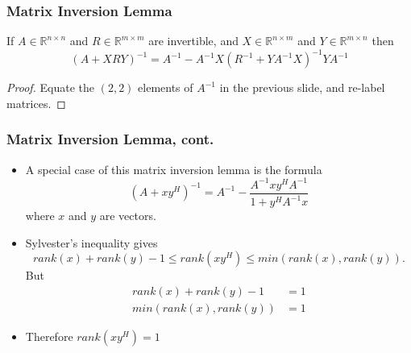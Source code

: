 \documentclass{beamer}
\begin{document}
\begin{frame}\frametitle{Matrix Inversion Lemma}
	\begin{lemma}
		If $A\in\mathbb{R}^{n\times n}$ and $R\in\mathbb{R}^{m\times m}$ are invertible, and $X\in\mathbb{R}^{n\times m}$ and $Y\in\mathbb{R}^{m\times n}$ then
		\[ (A + X R Y)^{-1} = A^{-1} - A^{-1}X(R^{-1}+YA^{-1}X)^{-1}YA^{-1} \]
	\end{lemma}
	\begin{proof}  Equate the $(2,2)$ elements of $A^{-1}$ in the previous slide, and re-label matrices.	
	\end{proof}
	
\end{frame}

\begin{frame}\frametitle{Matrix Inversion Lemma, cont.}
	\begin{itemize}
	\item 	A special case of this matrix inversion lemma is the formula
		\[ 
		(A + xy^H)^{-1} = A^{-1} - \frac{A^{-1}xy^H A^{-1}}{1 + y^H A^{-1}x} 
		\]
		where $x$ and $y$ are vectors.
	\item Sylvester's inequality gives
		\[
		rank(x)+rank(y) - 1 \leq rank(xy^H) \leq min(rank(x),rank(y)).
		\]
		But 
		\begin{align*}
			rank(x)+rank(y) - 1	&= 1 \\
			min(rank(x),rank(y)) &= 1
		\end{align*}
	\item Therefore $rank(xy^H) = 1$
	\end{itemize}
\end{frame}
\end{document}
